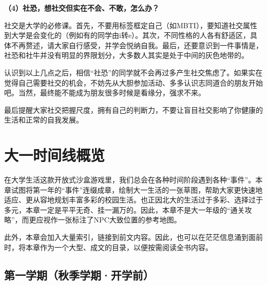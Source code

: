 \documentclass[11pt,oneside]{book}
\begin{document}
\textbf{（4）社恐，想社交但实在不会、不敢，怎么办？}

社交是大学的必修课。首先，不要用标签框定自己（如MBTI），要知道社交属性到大学是会变化的（例如有的同学由i转e）。其次，不同性格的人各有舒适区，具体不再赘述，请大家自行感受，并学会悦纳自我。最后，还要意识到一件事情是，社恐和社牛并没有明显的界限划分，大多数人其实是处于中间的灰色地带的。

\vspace{10pt}

认识到以上几点之后，相信“社恐”的同学就不会再过多产生社交焦虑了。如果实在觉得自己需要社交的机会，不妨先从大胆参加活动、多多认识志同道合的朋友开始吧。当然，最终能不能成为朋友很多时候是看缘分，强求不来。

\vspace{10pt}

最后提醒大家社交把握尺度，拥有自己的判断力，不要让盲目社交影响了你健康的生活和正常的自我发展。

\chapter{大一时间线概览}

在大学生活这款开放式沙盒游戏里，我们总会在各种时间阶段遇到各种“事件”。本章试图将第一年的“事件”连缀成章，绘制大一生活的一张草图，帮助大家更快速地适应、更从容地规划丰富多彩的校园生活。也正因北大的生活过于多彩、选择过于多元，本章一定是平平无奇、挂一漏万的。因此，本章不是大一年级的“通关攻略”，而更应视作一张标注了NPC大致位置的参考地图。

\vspace{10pt}

此外，本章会加入大量索引，链接到前文内容。因此，也可以在茫茫信息涌到面前时，将本章作为一个大型、成文的目录，以便按需阅读全书内容。

\section{第一学期（秋季学期·开学前）}

\vspace{10pt}
\end{document}

